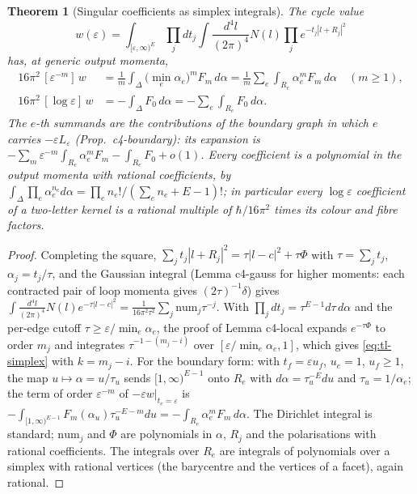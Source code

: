 \documentclass[11pt]{article}
\numberwithin{equation}{section}
\theoremstyle{plain}
\newtheorem{theorem}{Theorem}[section]
\theoremstyle{definition}
\begin{document}
\begin{theorem}[Singular coefficients as simplex integrals]
\label{thm:tl-simplex}
The cycle value\[w(\varepsilon)=\int_{[\varepsilon,\infty)^{E}}\prod_jdt_j\int\frac{d^4l}{(2\pi)^4}N(l)\prod_je^{-t_j|l+R_j|^2}\]has, at generic output momenta,
\begin{equation}
\begin{aligned}16\pi^2\,[\varepsilon^{-m}]\,w&=\frac1m\int_\Delta\big(\min_e\alpha_e\big)^mF_m\,d\alpha=\frac1m\sum_e\int_{R_e}\alpha_e^mF_m\,d\alpha\quad(m\ge1),\\ 16\pi^2\,[\log\varepsilon]\,w&=-\int_\Delta F_0\,d\alpha=-\sum_e\int_{R_e}F_0\,d\alpha .\end{aligned}
\label{eq:tl-simplex}
\end{equation}
The $e$-th summands are the contributions of the boundary graph in which $e$ carries $-\varepsilon L_\varepsilon$ (Prop.~c4-boundary): its expansion is $-\sum_m\varepsilon^{-m}\int_{R_e}\alpha_e^mF_m-\int_{R_e}F_0+o(1)$. Every coefficient is a polynomial in the output momenta with rational coefficients, by $\int_\Delta\prod_e\alpha_e^{n_e}d\alpha=\prod_en_e!/(\sum_en_e+E-1)!$; in particular every $\log\varepsilon$ coefficient of a two-letter kernel is a rational multiple of $\hbar/16\pi^2$ times its colour and fibre factors.
\end{theorem}

\begin{proof}
Completing the square, $\sum_jt_j|l+R_j|^2=\tau|l-c|^2+\tau\Phi$ with $\tau=\sum_jt_j$, $\alpha_j=t_j/\tau$, and the Gaussian integral (Lemma c4-gauss for higher moments: each contracted pair of loop momenta gives $(2\tau)^{-1}\delta$) gives $\int\frac{d^4l}{(2\pi)^4}N(l)e^{-\tau|l-c|^2}=\frac{1}{16\pi^2\tau^2}\sum_j\mathrm{num}_j\tau^{-j}$. With $\prod_jdt_j=\tau^{E-1}d\tau\,d\alpha$ and the per-edge cutoff $\tau\ge\varepsilon/\min_e\alpha_e$, the proof of Lemma c4-local expands $e^{-\tau\Phi}$ to order $m_j$ and integrates $\tau^{-1-(m_j-i)}$ over $[\varepsilon/\min_e\alpha_e,1]$, which gives \eqref{eq:tl-simplex} with $k=m_j-i$. For the boundary form: with $t_f=\varepsilon u_f$, $u_e=1$, $u_f\ge1$, the map $u\mapsto\alpha=u/\tau_u$ sends $[1,\infty)^{E-1}$ onto $R_e$ with $d\alpha=\tau_u^{-E}du$ and $\tau_u=1/\alpha_e$; the term of order $\varepsilon^{-m}$ of $-\varepsilon w|_{t_e=\varepsilon}$ is $-\int_{[1,\infty)^{E-1}}F_m(\alpha_u)\tau_u^{-E-m}du=-\int_{R_e}\alpha_e^mF_m\,d\alpha$. The Dirichlet integral is standard; $\mathrm{num}_j$ and $\Phi$ are polynomials in $\alpha$, $R_j$ and the polarisations with rational coefficients. The integrals over $R_e$ are integrals of polynomials over a simplex with rational vertices (the barycentre and the vertices of a facet), again rational.
\end{proof}
\end{document}
